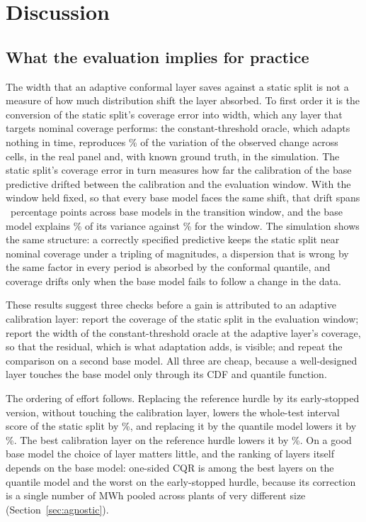 \section{Discussion}
\label{sec:discussion}

\subsection{What the evaluation implies for practice}
\label{sec:practica}

The width that an adaptive conformal layer saves against a static split is not a measure of how much distribution shift the layer absorbed. To first order it is the conversion of the static split's coverage error into width, which any layer that targets nominal coverage performs: the constant-threshold oracle, which adapts nothing in time, reproduces \% of the variation of the observed change across cells, in the real panel and, with known ground truth, in the simulation. The static split's coverage error in turn measures how far the calibration of the base predictive drifted between the calibration and the evaluation window. With the window held fixed, so that every base model faces the same shift, that drift spans ~percentage points across base models in the transition window, and the base model explains \% of its variance against \% for the window. The simulation shows the same structure: a correctly specified predictive keeps the static split near nominal coverage under a tripling of magnitudes, a dispersion that is wrong by the same factor in every period is absorbed by the conformal quantile, and coverage drifts only when the base model fails to follow a change in the data.

These results suggest three checks before a gain is attributed to an adaptive calibration layer: report the coverage of the static split in the evaluation window; report the width of the constant-threshold oracle at the adaptive layer's coverage, so that the residual, which is what adaptation adds, is visible; and repeat the comparison on a second base model. All three are cheap, because a well-designed layer touches the base model only through its CDF and quantile function.

The ordering of effort follows. Replacing the reference hurdle by its early-stopped version, without touching the calibration layer, lowers the whole-test interval score of the static split by \%, and replacing it by the quantile model lowers it by \%. The best calibration layer on the reference hurdle lowers it by \%. On a good base model the choice of layer matters little, and the ranking of layers itself depends on the base model: one-sided CQR is among the best layers on the quantile model and the worst on the early-stopped hurdle, because its correction is a single number of MWh pooled across plants of very different size (Section~\ref{sec:agnostic}).

